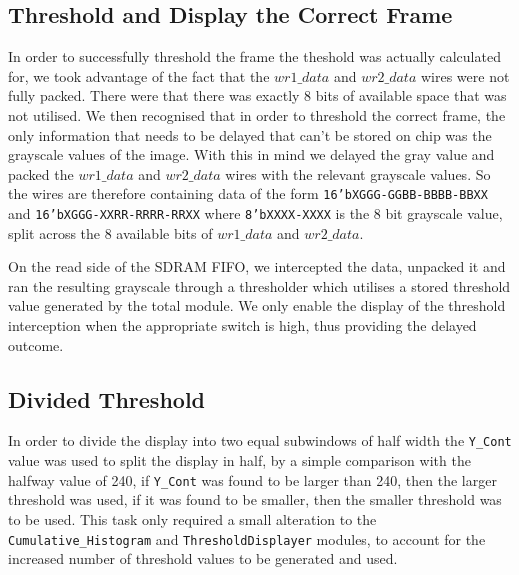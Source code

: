\documentclass[12pt]{article}
\begin{document}
  \subsection{Threshold and Display the Correct Frame}
  In order to successfully threshold the frame the theshold was actually calculated for, we took advantage of the fact that the \(wr1\_data\) and \(wr2\_data\) wires were not fully packed. There were that there was exactly 8 bits of available space that was not utilised. We then recognised that in order to threshold the correct frame, the only information that needs to be delayed that can't be stored on chip was the grayscale values of the image. With this in mind we delayed the gray value and packed the \(wr1\_data\) and \(wr2\_data\) wires with the relevant grayscale values. So the wires are therefore containing data of the form \texttt{16'bXGGG-GGBB-BBBB-BBXX} and \texttt{16'bXGGG-XXRR-RRRR-RRXX} where \texttt{8'bXXXX-XXXX} is the 8 bit grayscale value, split across the 8 available bits of \(wr1\_data\) and \(wr2\_data\).

  On the read side of the SDRAM FIFO, we intercepted the data, unpacked it and ran the resulting grayscale through a thresholder which utilises a stored threshold value generated by the total module. We only enable the display of the threshold interception when the appropriate switch is high, thus providing the delayed outcome.

  \subsection{Divided Threshold}
  In order to divide the display into two equal subwindows of half width the \texttt{Y\_Cont} value was used to split the display in half, by a simple comparison with the halfway value of 240, if \texttt{Y\_Cont} was found to be larger than 240, then the larger threshold was used, if it was found to be smaller, then the smaller threshold was to be used. This task only required a small alteration to the \texttt{Cumulative\_Histogram} and \texttt{ThresholdDisplayer} modules, to account for the increased number of threshold values to be generated and used.
\end{document}
